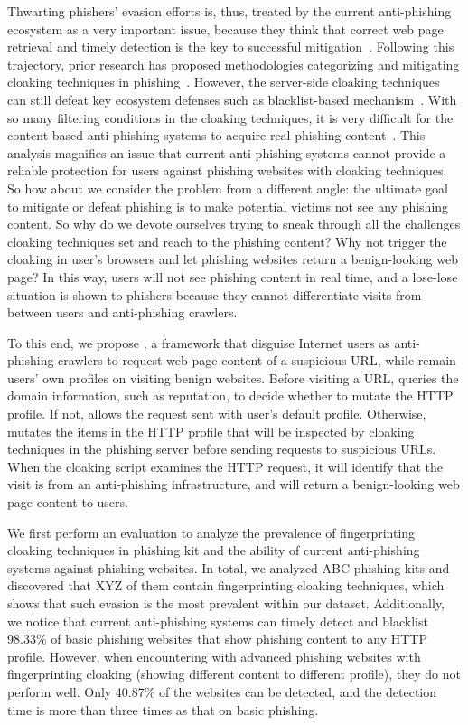 Thwarting phishers' evasion efforts is, thus, treated by the current anti-phishing ecosystem as a very important issue,
because they think that correct web page retrieval and timely detection is the key to successful mitigation~\cite{oest2020sunrise, zhang2021crawlphish}.
Following this trajectory, prior research has proposed methodologies categorizing and mitigating cloaking techniques in phishing~\cite{oest2018inside, oest2019phishfarm, zhang2021crawlphish}.
However, the server-side cloaking techniques can still defeat key ecosystem defenses such as blacklist-based mechanism~\cite{oest2019phishfarm}.
With so many filtering conditions in the cloaking techniques,
it is very difficult for the content-based anti-phishing systems to acquire real phishing content~\cite{oest2018inside, oest2020phishtime}.
This analysis magnifies an issue that current anti-phishing systems cannot provide a reliable protection for users against phishing websites with cloaking techniques.
So how about we consider the problem from a different angle:
the ultimate goal to mitigate or defeat phishing is to make potential victims not see any phishing content.
So why do we devote ourselves trying to sneak through all the challenges cloaking techniques set and reach to the phishing content?
Why not trigger the cloaking in user's browsers and let phishing websites return a benign-looking web page?
In this way, users will not see phishing content in real time, and a lose-lose situation is shown to phishers because they cannot differentiate visits from between users and anti-phishing crawlers.

To this end, we propose \spartacus, a framework that disguise Internet users as anti-phishing crawlers to request web page content of a suspicious URL, while remain users' own profiles on visiting benign websites.
Before visiting a URL, \spartacus queries the domain information, such as reputation, to decide whether to mutate the HTTP profile.
If not, \spartacus allows the request sent with user's default profile.
Otherwise, \spartacus mutates the items in the HTTP profile that will be inspected by cloaking techniques in the phishing server before sending requests to suspicious URLs.
When the cloaking script examines the HTTP request, it will identify that the visit is from an anti-phishing infrastructure, and will return a benign-looking web page content to users.

We first perform an evaluation to analyze the prevalence of fingerprinting cloaking techniques in phishing kit and the ability of current anti-phishing systems against phishing websites.  
In total, we analyzed ABC phishing kits and discovered that XYZ of them contain fingerprinting cloaking techniques, which shows that such evasion is the most prevalent within our dataset.
Additionally, we notice that current anti-phishing systems can timely detect and blacklist 98.33\% of basic phishing websites that show phishing content to any HTTP profile.
However, when encountering with advanced phishing websites with fingerprinting cloaking (showing different content to different profile), they do not perform well.
Only 40.87\% of the websites can be detected, and the detection time is more than three times as that on basic phishing.


